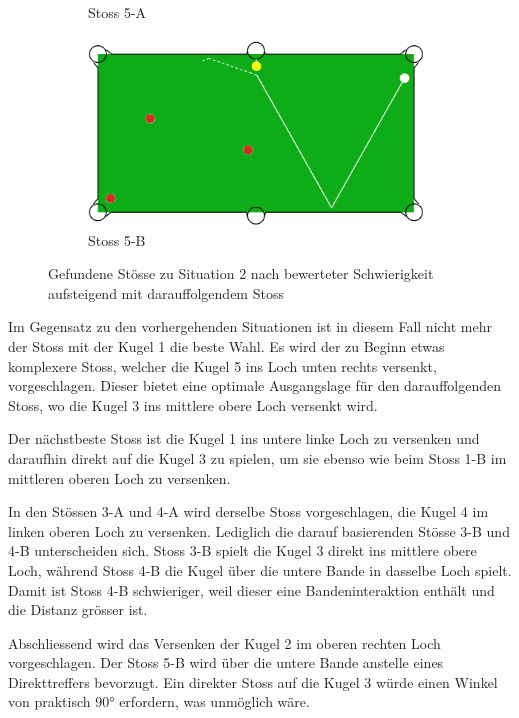 \begin{figure}[h!]
\begin{subfigure}[b]{0.4\textwidth}
        \caption{Stoss 5-A}
        \label{fig:situation_2_solution_5a}
    \end{subfigure}
    \hfill
    \begin{subfigure}[b]{0.4\textwidth}
        \centering
        \includegraphics[width=1.0\linewidth]{../common/04_results/resources/simple_search/situation_diverse_solution_deep_search_5b.PNG}
        \caption{Stoss 5-B}
        \label{fig:situation_2_solution_5b}
    \end{subfigure}
    \caption{Gefundene Stösse zu Situation 2 nach bewerteter Schwierigkeit aufsteigend mit darauffolgendem Stoss}
    \label{fig:situation_2_solutions}
\end{figure}

Im Gegensatz zu den vorhergehenden Situationen ist in diesem Fall nicht mehr der Stoss mit der Kugel 1
die beste Wahl. Es wird der zu Beginn etwas komplexere Stoss, welcher die Kugel 5 ins Loch unten
rechts versenkt, vorgeschlagen. Dieser bietet eine optimale Ausgangslage für den darauffolgenden Stoss,
wo die Kugel 3 ins mittlere obere Loch versenkt wird.

Der nächstbeste Stoss ist die Kugel 1 ins untere linke Loch zu versenken und
daraufhin direkt auf die Kugel 3 zu spielen, um sie ebenso wie beim Stoss 1-B im mittleren oberen Loch zu versenken.

In den Stössen 3-A und 4-A wird derselbe Stoss vorgeschlagen, die Kugel 4 im linken oberen Loch zu versenken.
Lediglich die darauf basierenden Stösse 3-B und 4-B unterscheiden sich.
Stoss 3-B spielt die Kugel 3 direkt ins mittlere obere Loch, während Stoss 4-B die Kugel über die untere Bande in dasselbe Loch spielt.
Damit ist Stoss 4-B schwieriger, weil dieser eine Bandeninteraktion enthält und die Distanz grösser ist.

Abschliessend wird das Versenken der Kugel 2 im oberen rechten Loch vorgeschlagen.
Der Stoss 5-B wird über die untere Bande anstelle eines Direkttreffers bevorzugt.
Ein direkter Stoss auf die Kugel 3 würde einen Winkel von praktisch \ang{90} erfordern, was unmöglich wäre.

